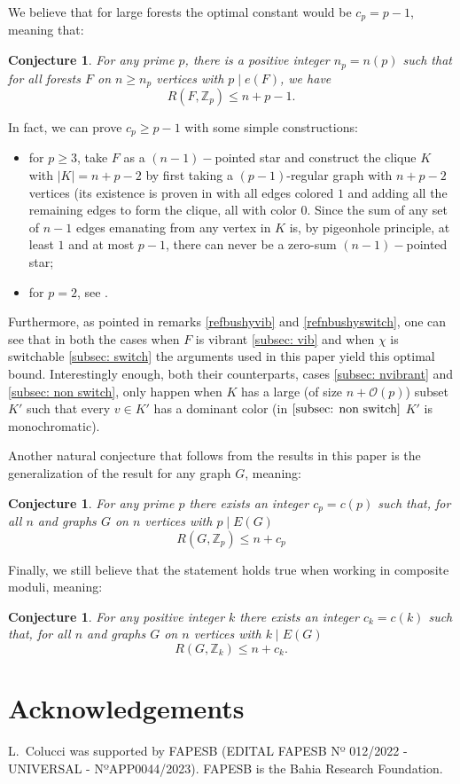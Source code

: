 \documentclass{article}
\numberwithin{table}{section}
\newtheorem{conj}[theorem]{Conjecture}
\begin{document}
\medskip

We believe that for large forests the optimal constant would be $c_p = p-1$, meaning that:
\begin{conj}
For any prime $p$, there is a positive integer $n_p = n(p)$ such that for all forests $F$ on $n\geq n_p$ vertices with $p\mid e(F)$, we have
    $$R(F,\mathbb{Z}_p) \leq n+p-1.$$
\end{conj}

In fact, we can prove $c_p\geq p-1$ with some simple constructions:
\begin{itemize}
    \item for $p\geq 3$, take $F$ as a $(n-1)-$pointed star and construct the clique $K$ with $|K|  = n+p-2$ by first taking a $(p-1)$-regular graph with $n+p-2$ vertices (its existence is proven in  with all edges colored $1$ and adding all the remaining edges to form the clique, all with color $0$. Since the sum of any set of $n-1$ edges emanating from any vertex in $K$ is, by pigeonhole principle, at least $1$ and at most $p-1$, there can never be a zero-sum $(n-1)-$pointed star;
    \item for $p=2$, see \cite{caro1994complete}.
\end{itemize}

Furthermore, as pointed in remarks \ref{refbushyvib} and \ref{refnbushyswitch}, one can see that in both the cases when $F$ is vibrant \ref{subsec: vib} and when $\chi$ is switchable \ref{subsec: switch} the arguments used in this paper yield this optimal bound. Interestingly enough, both their counterparts, cases \ref{subsec: nvibrant} and \ref{subsec: non switch}, only happen when $K$ has a large (of size $n+\mathcal{O}(p)$) subset $K'$ such that every $v\in K'$ has a dominant color (in $\ref{subsec: non switch}$ $K'$ is monochromatic).
\medskip


Another natural conjecture that follows from the results in this paper is the generalization of the result for any graph $G$, meaning:
\begin{conj}
    For any prime $p$ there exists an integer $c_p = c(p)$ such that, for all $n$ and graphs $G$ on $n$ vertices with $p\mid E(G)$
    $$R(G,\mathbb{Z}_p) \leq n+c_p$$
\end{conj}

Finally, we still believe that the statement holds true when working in composite moduli, meaning:
\begin{conj}
    For any positive integer $k$ there exists an integer $c_k = c(k)$ such that, for all $n$ and graphs $G$ on $n$ vertices with $k\mid E(G)$
    $$R(G,\mathbb{Z}_k) \leq n+c_k.$$
\end{conj}

\section*{Acknowledgements}


L.~Colucci was supported by FAPESB (EDITAL FAPESB Nº 012/2022 - UNIVERSAL -
NºAPP0044/2023). FAPESB is the Bahia Research Foundation.




\end{document}
